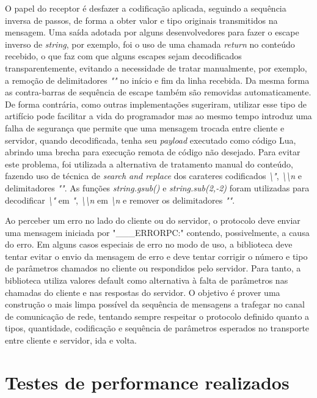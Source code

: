 \documentclass[11pt]{article}
\begin{document}
O papel do receptor é desfazer a codificação aplicada, seguindo a sequência
inversa de passos, de forma a obter valor e tipo originais transmitidos na
mensagem. Uma saída adotada por alguns desenvolvedores para fazer o escape
inverso de \textit{string}, por exemplo, foi o uso de uma chamada
\textit{return} no conteúdo recebido, o que faz com que alguns escapes sejam
decodificados transparentemente, evitando a necessidade de tratar manualmente,
por exemplo, a remoção de delimitadores \textit{""} no início e fim da linha recebida. Da
mesma forma as contra-barras de sequência de escape também são removidas
automaticamente. De forma contrária, como outras implementações sugeriram,
utilizar esse tipo de artifício pode facilitar a vida do programador mas ao mesmo
tempo introduz uma falha de segurança que permite que uma mensagem trocada
entre cliente e servidor, quando decodificada, tenha seu \textit{payload}
executado como código Lua, abrindo uma brecha para execução remota de código não
desejado. Para evitar este problema, foi utilizada a alternativa de tratamento
manual do conteúdo, fazendo uso de técnica de \textit{search and replace} dos
carateres codificados \textit{\textbackslash{}"}, \textit{\textbackslash{}\textbackslash{}n} e delimitadores \textit{""}. As funções
\textit{string.gsub()} e \textit{string.sub(2,-2)} foram utilizadas para
decodificar \textit{\textbackslash{}"} em \textit{"}, \textit{\textbackslash{}\textbackslash{}n} em \textit{\textbackslash{}n} e remover os
delimitadores \textit{""}.

Ao perceber um erro no lado do cliente ou do servidor, o protocolo deve enviar
uma mensagem iniciada por "\_\_\_ERRORPC:" contendo, possivelmente, a causa do
erro. Em alguns casos especiais de erro no modo de uso, a biblioteca deve tentar evitar
o envio da mensagem de erro e deve tentar corrigir o número e tipo de parâmetros chamados no
cliente ou respondidos pelo servidor. Para tanto, a biblioteca utiliza valores default como
alternativa à falta de parâmetros nas chamadas do cliente e nas respostas do
servidor. O objetivo é prover uma construção o mais limpa possível da sequência
de mensagens a trafegar no canal de comunicação de rede, tentando sempre respeitar o
protocolo definido quanto a tipos, quantidade, codificação e sequência de
parâmetros esperados no transporte entre cliente e servidor, ida e volta.

\section{Testes de performance realizados}\label{sec:perf}
\end{document}
